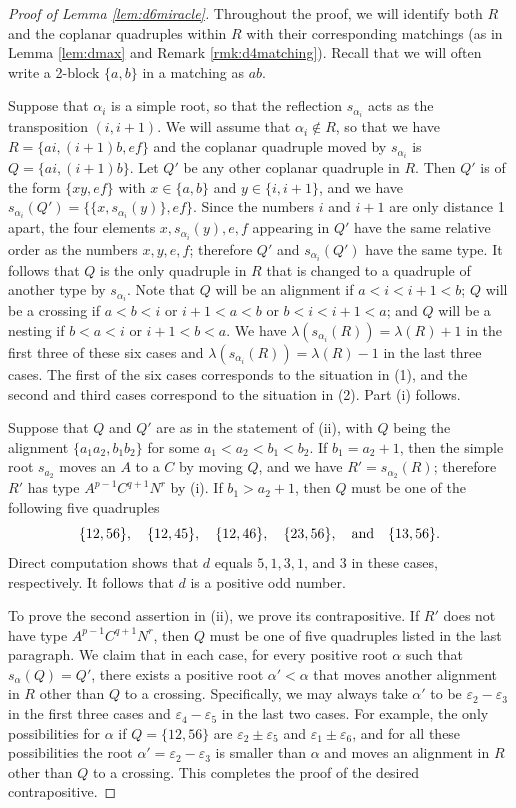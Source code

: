 \documentclass[11pt]{amsart}
\theoremstyle{plain}
\theoremstyle{definition}
\theoremstyle{remark}
\numberwithin{equation}{subsection}
\newcommand{\al}{\alpha}
\newcommand{\ep}{\varepsilon}
\begin{document}
\begin{proof}[Proof of Lemma \ref{lem:d6miracle}]
Throughout the proof, we will identify both $R$ and the coplanar quadruples
within $R$ with their corresponding matchings (as in Lemma \ref{lem:dmax} and
Remark \ref{rmk:d4matching}). Recall that we will often write a 2-block
$\{a,b\}$ in a matching as $ab$.

Suppose that $\al_i$ is a simple root, so that the reflection $s_{\al_i}$ acts
as the transposition $(i, i+1)$. We will assume that $\al_i \not\in R$, so that
we have $R=\{ai,(i+1)b,ef\}$ and the coplanar quadruple moved by $s_{\al_i}$ is
$Q=\{ai,(i+1)b\}$.  Let $Q'$ be any other coplanar quadruple in $R$. Then $Q'$
is of the form $\{xy,ef\}$ with $x\in \{a,b\}$ and $y\in \{i,i+1\}$, and we have
$s_{\al_i}(Q')=\{\{x,s_{\al_i}(y)\},ef\}$. Since the numbers $i$ and $i+1$ are
only distance 1 apart, the four elements $x, s_{\al_i}(y), e,f$ appearing in
$Q'$ have the same relative order as the numbers $x,y,e,f$; therefore $Q'$ and
$s_{\al_i}(Q')$ have the same type. It follows that $Q$ is the only quadruple in
$R$ that is changed to a quadruple of another type by  $s_{\al_i}$.  Note that
$Q$ will be an alignment if $a < i < i+1 < b$; $Q$ will be a crossing if $a < b
< i$ or $i+1 < a < b$ or $b < i < i+1 < a$; and $Q$ will be a nesting if $b < a
< i$ or $i+1 < b < a$.  We have $\lambda(s_{\al_i}(R)) = \lambda(R)+1$ in the
first three of these six cases and $\lambda(s_{\al_i}(R))=\lambda(R)-1$ in the
last three cases. The first of the six cases corresponds to the situation in
(1), and the second and third cases correspond to the situation in (2). Part (i)
follows.

Suppose that $Q$ and $Q'$ are as in the statement of (ii), with $Q$ being the
alignment $\{a_1a_2,b_1b_2\}$ for some $a_1 < a_2 < b_1 < b_2$.  If $b_1 = a_2 +
1$, then the simple root $s_{a_2}$ moves an $A$ to a $C$ by moving $Q$, and we
have $R'=s_{\al_2}(R)$; therefore $R'$ has type $A^{p-1}C^{q+1}N^{r}$ by (i). If
$b_1>a_2+1$, then $Q$ must be one of the following five quadruples \[
    \{12,56\},\quad \{12,45\},\quad \{12, 46 \},\quad \{23,
    56\},\quad\text{and\quad} \{13,56\}.  \] Direct computation shows that $d$
    equals $5,1,3,1$, and $3$ in these cases, respectively. It follows that $d$
    is a positive odd number.

To prove the second assertion in (ii), we prove its contrapositive. If $R'$ does
not have type $A^{p-1}C^{q+1}N^r$, then $Q$ must be one of five quadruples
listed in the  last paragraph. We claim that in each case, for every positive
root $\al$ such that $s_\al(Q)=Q'$, there exists a positive root $\al'<\al$ that
moves another alignment in $R$ other than $Q$ to a crossing. Specifically, we may
always take $\al'$ to be $\ep_2-\ep_3$ in the first three cases and
$\ep_4-\ep_5$ in the last two cases. For example, the only possibilities for
$\al$ if $Q=\{12,56\}$ are $\ep_2\pm\ep_5$ and $\ep_1\pm\ep_6$, and for all
these possibilities the root $\al'=\ep_2-\ep_3$ is smaller than $\al$ and moves
an alignment in $R$ other than $Q$ to a crossing. This completes the proof of
the desired contrapositive.


\end{proof}
\end{document}
